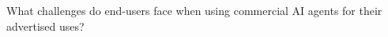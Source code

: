 \documentclass[final]{article}
\newcommand{\bandGap}{\par\vspace{42pt}}
\begin{document}
\begin{minipage}[t]{\linewidth}
\begin{minipage}[t]{0.485\linewidth}
\begin{minipage}[t]{\linewidth}
{\begin{minipage}[t]{\dimexpr\linewidth-58pt\relax}
          {\sansfont\fontsize{22.8pt}{27.36pt}\selectfont\color{blueAcc}}\par
          \vspace{6.84pt}
          {\displayfont\fontsize{34.2pt}{43.32pt}\selectfont
           What challenges do end-users face when using commercial AI agents for their advertised uses?\par}
        \end{minipage}}\par
    \end{minipage}
  \end{minipage}
\end{minipage}

\bandGap

\noindent
\end{document}
